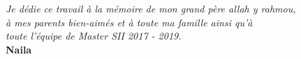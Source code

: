 

\begin{flushright}
 	\textit{Je dédie ce travail à la mémoire de mon grand père allah y rahmou,}\\
 	 \textit{à mes parents bien-aimés et à toute ma famille ainsi qu'à}\\
 	 \textit{toute l'équipe de Master SII 2017 - 2019.}\\
 	 \vspace{0.5cm}
 	\textbf{Naila}
\end{flushright}

